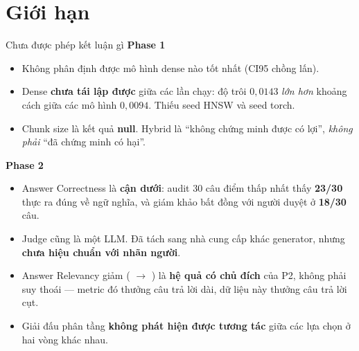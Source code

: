 \section{Giới hạn}

\begin{frame}[shrink=20]{Chưa được phép kết luận gì}
  \small
  \textbf{Phase 1}
  \begin{itemize}\small
    \item Không phân định được mô hình dense nào tốt nhất (CI95 chồng lấn).
    \item Dense \textbf{chưa tái lập được} giữa các lần chạy: độ trôi $0{,}0143$
          \emph{lớn hơn} khoảng cách giữa các mô hình $0{,}0094$. Thiếu seed HNSW
          và seed torch.
    \item Chunk size là kết quả \textbf{null}. Hybrid là ``không chứng minh được
          có lợi'', \emph{không phải} ``đã chứng minh có hại''.
  \end{itemize}

  \vspace{0.4em}
  \textbf{Phase 2}
  \begin{itemize}\small
    \item Answer Correctness \NumHoAC{} là \textbf{cận dưới}: audit 30 câu điểm
          thấp nhất thấy \textbf{23/30} thực ra đúng về ngữ nghĩa, và giám khảo
          bất đồng với người duyệt ở \textbf{18/30} câu.
    \item Judge cũng là một LLM. Đã tách sang nhà cung cấp khác generator, nhưng
          \textbf{chưa hiệu chuẩn với nhãn người}.
    \item Answer Relevancy giảm (\NumDevAnsRel{} $\rightarrow$ \NumHoAnsRel{}) là
          \textbf{hệ quả có chủ đích} của P2, không phải suy thoái --- metric đó
          thưởng câu trả lời dài, dữ liệu này thưởng câu trả lời cụt.
    \item Giải đấu phân tầng \textbf{không phát hiện được tương tác} giữa các
          lựa chọn ở hai vòng khác nhau.
  \end{itemize}

\end{frame}

